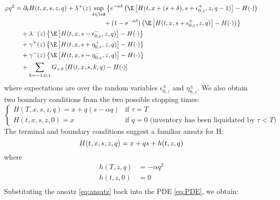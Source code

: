 \documentclass[12pt]{article}
\begin{document}
\begin{equation}\label{eq:PDE}
\begin{split}
\varphi q^2 & = \partial_t H(t,x,s,z,q) + \lambda^+(z)  \sup\limits_{\delta \in \cA} \left\lbrace  e^{ -\kappa \delta } \left( \E \left[ H(t,x + (s + \delta), s + \epsilon^+_{0,z}, z, q-1) \right] - H(\cdot) \right) \right. \\
& \left. \hphantom{\partial_t H(t,x,s,z,q) + \lambda^+(z)  \sup\limits_{\delta \in \cA} \left\lbrace \right.} + (1 - e^{-\kappa \delta}) \left( \E \left[ H(t, x, s+\epsilon^+_{0,z},z,q) \right] - H(\cdot) \right) \right\rbrace \\
& \quad + \lambda^-(z) \left\lbrace \E \left[ H(t,x, s-\epsilon^-_{0,z},z,q) \right] - H(\cdot) \right\rbrace \\
& \quad + \gamma^+(z) \left\lbrace \E \left[ H(t,x, s+\eta^+_{0,z},z,q) \right] - H(\cdot) \right\rbrace \\
& \quad + \gamma^-(z) \left\lbrace \E \left[ H(t,x, s-\eta^-_{0,z},z,q) \right] - H(\cdot) \right\rbrace \\
& \quad + \sum_{k=-1,0,1} G_{z,k} \left[ H(t,x,s,k,q) - H(\cdot) \right]
\end{split}
\end{equation}
where expectations are over the random variables $\epsilon^{\pm}_{0,z}$ and $\eta^{\pm}_{0,z}$. We also obtain two boundary conditions from the two possible stopping times:
\[\begin{cases}
H(T,x,s,z,q) = x + q(s - \alpha q) & \text{if }\tau = T \\
H(t,x,s,z,0) = x & \text{if } q=0 \text{ (inventory has been liquidated by } \tau < T \text{)}
\end{cases}\]
The terminal and boundary conditions suggest a familiar ansatz for H:
\begin{equation}\label{eq:ansatz}
H(t,x,s,z,q) = x + qs + h(t,z,q) \\
\end{equation}
where
\begin{align*}
h(T,z,q) & = -\alpha q^2  \\
h(t,z,0) &  = 0  \\
\end{align*}
Substituting the ansatz \ref{eq:ansatz} back into the PDE \ref{eq:PDE}, we obtain:
\end{document}
